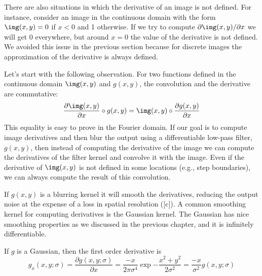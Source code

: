 There are also situations in which the derivative of an image is not defined. For instance, consider an image in the continuous domain with the form $\img (x,y) = 0$ if $x<0$ and 1 otherwise. If we try to compute $\partial \img (x,y) / \partial x$ we will get 0 everywhere, but around $x=0$ the value of the derivative is not defined. We avoided this issue in the previous section because for discrete images the approximation of the derivative is always defined.

Let's start with the following observation. For two functions defined in the continuous domain $\img(x,y)$ and $g(x,y)$, the convolution and the derivative are commutative:
\begin{equation}
	\frac {\partial \img(x,y)}{\partial x} \circ g(x,y) = \img(x,y) \circ \frac {\partial g(x,y)}{\partial x}
\end{equation}
This equality is easy to prove in the Fourier domain. If our goal is to compute image derivatives and then blur the output using a differentiable low-pass filter, $g(x,y)$, then instead of computing the derivative of the image we can compute the derivatives of the filter kernel and convolve it with the image. Even if the derivative of $\img(x,y)$ is not defined in some locations (e.g., step boundaries), we can always compute the result of this convolution.

If $g(x,y)$ is a blurring kernel it will smooth the derivatives, reducing the output noise at the expense of a loss in spatial resolution (\fig{\ref{fig:derivativesnoisystop}}[c]). A common smoothing kernel for computing derivatives is the Gaussian kernel. The Gaussian has nice smoothing properties as we discussed in the previous chapter, and it is infinitely differentiable.

If $g$ is a Gaussian, then the first order derivative is
\begin{equation}
	g_x(x,y; \sigma) = \frac {\partial g(x,y; \sigma)}{\partial x}= \frac{-x}{2 \pi \sigma^4} \exp{-\frac{x^2 +
			y^2}{2 \sigma^2}} = \frac{-x}{\sigma^2} g(x,y; \sigma)
	\label{eq:derivate1gauss2dcont}
\end{equation}

